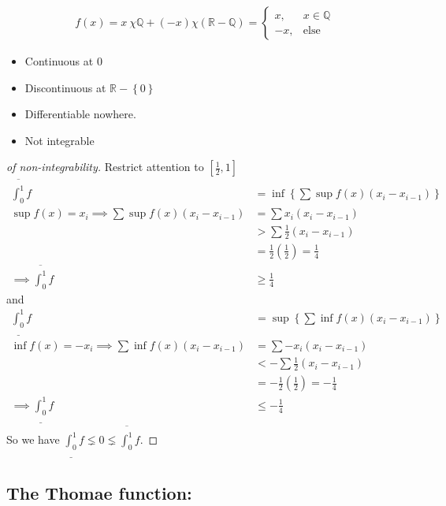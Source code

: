 \begin{align*}
f ( x ) = x~\chi{{\mathbb{Q}}} + (-x)\chi({\mathbb{R}}-{\mathbb{Q}}) = \begin{cases}
x, & x\in {\mathbb{Q}}\\
-x, & \text{else}
\end{cases}
\end{align*}

\begin{itemize}
\tightlist
\item
  Continuous at 0
\item
  Discontinuous at \({\mathbb{R}}-\left\{{0}\right\}\)
\item
  Differentiable nowhere.
\item
  Not integrable
\end{itemize}

\begin{proof}[of non-integrability]

Restrict attention to \({\left[ {\frac 1 2, 1} \right]}\)
\begin{align*}
\overline{\int_0^1} f 
&= \inf \left\{{ \sum \sup f(x) (x_i - x_{i-1}) }\right\} \\
\sup f(x) = x_i \implies 
\sum \sup f(x) (x_i - x_{i-1}) &= \sum x_i (x_i - x_{i-1}) \\
&> \sum \frac 1 2 (x_i - x_{i-1}) \\
&= \frac 1 2 \left(\frac 1 2\right) = \frac 1 4 \\
\implies \overline{\int_0^1} f &\geq \frac 1 4
\end{align*}
and
\begin{align*}
\underline{\int_0^1} f 
&= \sup \left\{{ \sum \inf f(x) (x_i - x_{i-1})}\right\} \\
\inf f(x)= -x_i \implies 
\sum \inf f(x) (x_i - x_{i-1}) 
&= \sum -x_i (x_i - x_{i-1}) \\
&< -\sum \frac 1 2 (x_i - x_{i-1}) \\
&= -\frac 1 2 \left( \frac 1 2 \right) = -\frac 1 4 \\
\implies \underline{\int_0^1} f &\leq -\frac 1 4
\end{align*}
So we have
\(\underline{\int_0^1} f \lneq 0 \lneq \overline{\int_0^1} f\).

\end{proof}

\hypertarget{the-thomae-function}{%
\subsection{The Thomae function:}\label{the-thomae-function}}

